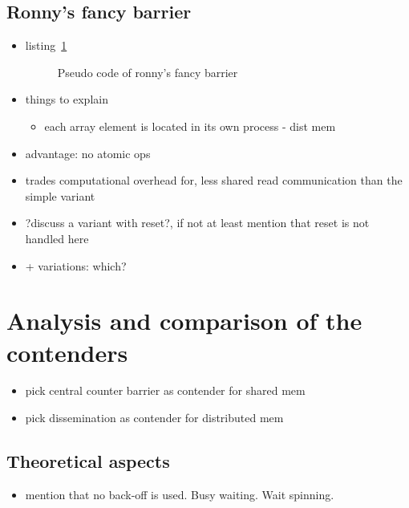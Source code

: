 \documentclass[a4paper, 10pt]{article}
\begin{document}
\subsection{Ronny's fancy barrier}
\begin{itemize}
	\item listing~\ref{listing:ronny-fancy-no-reset}
		\begin{figure}[htbp]
			\centering
			
			\caption{Pseudo code of ronny's fancy barrier}
			\label{listing:ronny-fancy-no-reset}
		\end{figure}

	\item things to explain
		\begin{itemize}
			\item each array element is located in its own process - dist mem
		\end{itemize}

	\item advantage: no atomic ops
	\item trades computational overhead for, less shared read communication than the simple variant
	\item ?discuss a variant with reset?, if not at least mention that reset is not handled here
	\item + variations: which?
\end{itemize}

\section{Analysis and comparison of the contenders}

\begin{itemize}
	\item pick central counter barrier as contender for shared mem
	\item pick dissemination as contender for distributed mem
\end{itemize}

\subsection{Theoretical aspects}
\begin{itemize}
	\item mention that no back-off is used. Busy waiting. Wait spinning.
\end{itemize}
\end{document}
